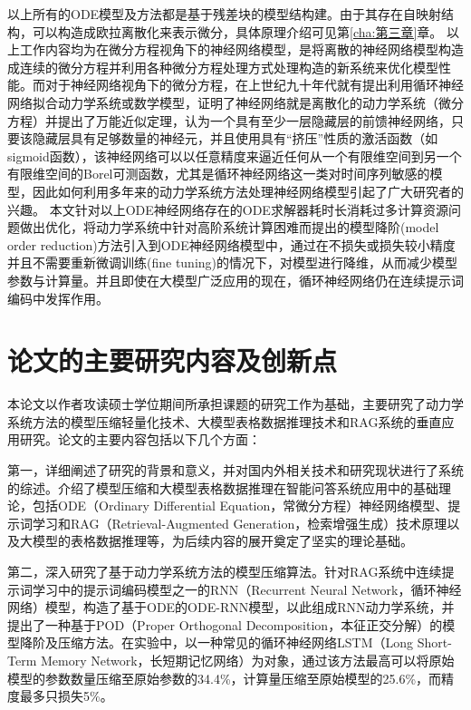 以上所有的ODE模型及方法都是基于残差块\cite{weinan2017proposal}的模型结构建。由于其存在自映射结构，可以构造成欧拉离散化来表示微分，具体原理介绍可见第\ref{cha:第三章}章。
以上工作内容均为在微分方程视角下的神经网络模型，是将离散的神经网络模型构造成连续的微分方程并利用各种微分方程处理方式处理构造的新系统来优化模型性能。而对于神经网络视角下的微分方程，在上世纪九十年代就有提出利用循环神经网络拟合动力学系统或数学模型\cite{cybenko1989approximation,li2022deep,cao2018brits,pearlmutter1989learning,neil2016phased,che2018recurrent}，证明了神经网络就是离散化的动力学系统（微分方程）并提出了万能近似定理，认为一个具有至少一层隐藏层的前馈神经网络，只要该隐藏层具有足够数量的神经元，并且使用具有“挤压”性质的激活函数（如sigmoid函数），该神经网络可以以任意精度来逼近任何从一个有限维空间到另一个有限维空间的Borel可测函数，尤其是循环神经网络这一类对时间序列敏感的模型，因此如何利用多年来的动力学系统方法处理神经网络模型引起了广大研究者的兴趣。
本文针对以上ODE神经网络存在的ODE求解器耗时长消耗过多计算资源问题做出优化，将动力学系统中针对高阶系统计算困难而提出的模型降阶(model order reduction)方法引入到ODE神经网络模型中，通过在不损失或损失较小精度并且不需要重新微调训练(fine tuning)的情况下，对模型进行降维，从而减少模型参数与计算量。并且即使在大模型广泛应用的现在，循环神经网络仍在连续提示词编码中发挥作用。


\section{论文的主要研究内容及创新点}
本论文以作者攻读硕士学位期间所承担课题的研究工作为基础，主要研究了动力学系统方法的模型压缩轻量化技术、大模型表格数据推理技术和RAG系统的垂直应用研究。论文的主要内容包括以下几个方面： 

第一，详细阐述了研究的背景和意义，并对国内外相关技术和研究现状进行了系统的综述。介绍了模型压缩和大模型表格数据推理在智能问答系统应用中的基础理论，包括ODE（Ordinary Differential Equation，常微分方程）神经网络模型、提示词学习和RAG（Retrieval-Augmented Generation，检索增强生成）技术原理以及大模型的表格数据推理等，为后续内容的展开奠定了坚实的理论基础。 

第二，深入研究了基于动力学系统方法的模型压缩算法。针对RAG系统中连续提示词学习中的提示词编码模型之一的RNN（Recurrent Neural Network，循环神经网络）模型，构造了基于ODE的ODE-RNN模型，以此组成RNN动力学系统，并提出了一种基于POD（Proper Orthogonal Decomposition，本征正交分解）的模型降阶及压缩方法。在实验中，以一种常见的循环神经网络LSTM（Long Short-Term Memory Network，长短期记忆网络）为对象，通过该方法最高可以将原始模型的参数数量压缩至原始参数的34.4\%，计算量压缩至原始模型的25.6\%，而精度最多只损失5\%。

